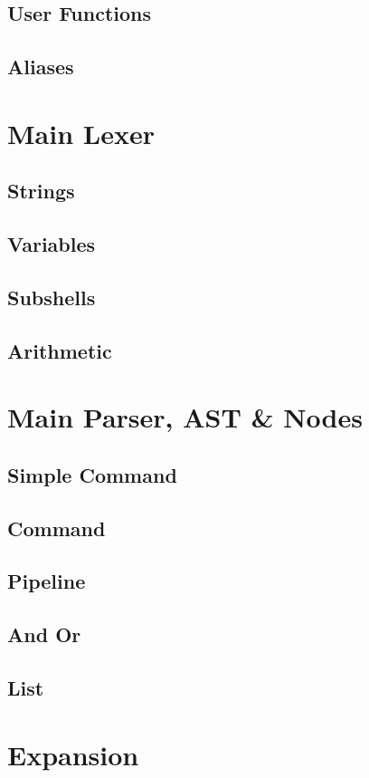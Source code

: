 \subsection{User Functions}
\subsection{Aliases}

\section{Main Lexer}

\subsection{Strings}
\subsection{Variables}
\subsection{Subshells}
\subsection{Arithmetic}

\section{Main Parser, AST \& Nodes}

\subsection{Simple Command}
\subsection{Command}
\subsection{Pipeline}
\subsection{And Or}
\subsection{List}

\section{Expansion}

